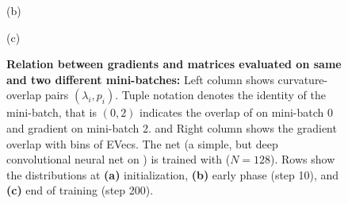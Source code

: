 \begin{figure}[!b]
  \vspace{-2.5\baselineskip}

  \begin{flushleft}
    \vspace{1ex}
    (b)
  \end{flushleft}
  \vspace{-2\baselineskip}

  \hfill
  \begin{minipage}[t]{0.495\linewidth}
    \centering
    
  \end{minipage}
  \begin{minipage}[t]{0.495\linewidth}
    \centering
    
  \end{minipage}
  \hfill

  \vspace{-2.5\baselineskip}

  \begin{flushleft}
    \vspace{1ex}
    (c)
  \end{flushleft}
  \vspace{-2\baselineskip}

  \hfill
  \begin{minipage}[t]{0.495\linewidth}
    \centering
    
  \end{minipage}
  \begin{minipage}[t]{0.495\linewidth}
    \centering
    
  \end{minipage}
  \hfill
  \vspace{-2\baselineskip}

  \caption{\textbf{Relation between gradients and \ggn matrices evaluated on
      same and two different mini-batches:} Left column shows curvature-overlap
    pairs $(\lambda_i, p_i)$. Tuple notation denotes the identity of the
    mini-batch, that is $(0,2)$ indicates the overlap of \ggn on mini-batch 0
    and gradient on mini-batch 2. and Right column shows the gradient overlap
    with bins of EVecs. The net (a simple, but deep convolutional neural net on
    \mnist) is trained with \sgd ($N=128$). Rows show the distributions at
    \textbf{(a)} initialization, \textbf{(b)} early phase (step 10), and
    \textbf{(c)} end of training (step 200).}
  \label{fig:gradient-curvature-overlap-batches-0-2}
\end{figure}


